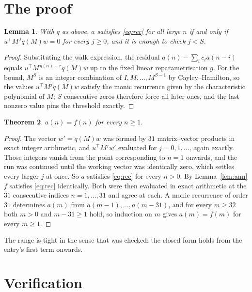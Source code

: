 \documentclass[11pt,a4paper]{article}
\theoremstyle{plain}
\newtheorem{theorem}{Theorem}
\newtheorem{lemma}[theorem]{Lemma}
\theoremstyle{definition}
\begin{document}
\section{The proof}

\begin{lemma}\label{lem:crit}
With $q$ as above, $a$ satisfies \eqref{eq:rec} for all large $n$ if and only if
$u^{\!\top}M^{\,j}q(M)w=0$ for every $j\ge0$, and it is enough to check $j<S$.
\end{lemma}

\begin{proof}
Substituting the walk expression, the residual $a(n)-\sum_ic_ia(n-i)$ equals
$u^{\!\top}M^{\,g(n)-r}q(M)w$ up to the fixed linear reparametrisation $g$. For the bound,
$M^{S}$ is an integer combination of $I,M,\dots,M^{S-1}$ by Cayley--Hamilton, so the values
$u^{\!\top}M^{j}q(M)w$ satisfy the monic recurrence given by the characteristic polynomial of
$M$; $S$ consecutive zeros therefore force all later ones, and the last nonzero value pins the
threshold exactly.
\end{proof}

\begin{theorem}
$a(n)=f(n)$ for every $n\ge1$.
\end{theorem}

\begin{proof}
The vector $w'=q(M)w$ was formed by $31$ matrix--vector products in exact integer
arithmetic, and $u^{\!\top}M^{j}w'$ evaluated for $j=0,1,\dots$, again exactly. Those integers
vanish from the point corresponding to $n=1$ onwards, and the run was continued until the
working vector was identically zero, which settles every larger $j$ at once. So $a$ satisfies
\eqref{eq:rec} for every $n>0$. By Lemma~\ref{lem:ann} $f$ satisfies \eqref{eq:rec}
identically. Both were then evaluated in exact arithmetic at the $31$ consecutive indices
$n=1,\dots,31$ and agree at each. A monic recurrence of order $31$
determines $a(m)$ from $a(m-1),\dots,a(m-31)$, and for every $m\ge32$ both
$m>0$ and $m-31\ge1$ hold, so induction on $m$ gives $a(m)=f(m)$ for every
$m\ge1$.
\end{proof}

The range is tight in the sense that was checked: the closed form holds from the entry's first term onwards.

\section{Verification}
\end{document}
